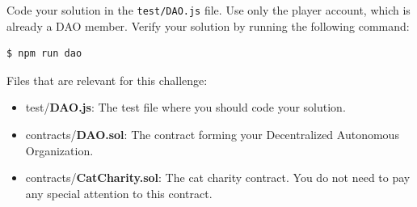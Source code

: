 \documentclass[12pt]{article}
\begin{document}
\noindent
Code your solution in the \texttt{test/DAO.js} file. Use only the player account, which is already a DAO member.  Verify your solution by running the following command:

\begin{verbatim}
$ npm run dao
\end{verbatim}

\noindent
Files that are relevant for this challenge:
\begin{itemize}
\item test/\textbf{DAO.js}: The test file where you should code your solution.
\item contracts/\textbf{DAO.sol}: The contract forming your Decentralized Autonomous Organization.
\item contracts/\textbf{CatCharity.sol}: The cat charity contract. You do not need to pay any special attention to this contract.
\end{itemize}
\end{document}
